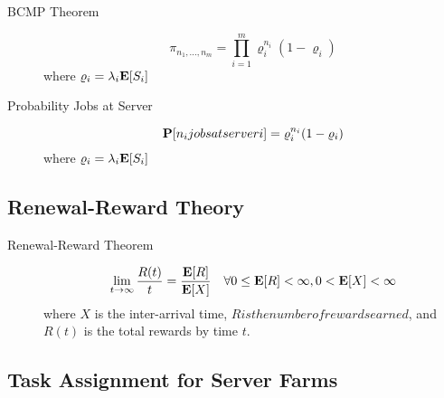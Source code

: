 \begin{description}

	\item [BCMP Theorem]
		\begin{equation}
		\pi_{n_{1},...,n_{m}} = \prod_{i=1}^{m} \varrho_{i}^{n_{i}} (1-\varrho_{i})
		\end{equation}		
		where $\varrho_{i}=\lambda_{i}\mathbf{E}[S_{i}]$
		
	\item [Probability Jobs at Server]
		\begin{equation}
		\mathbf{P}[n_{i} jobs at server i] = \varrho_{i}^{n_{i}} (1-\varrho_{i})
		\end{equation}
		where $\varrho_{i}=\lambda_{i}\mathbf{E}[S_{i}]$
	
\end{description}




\subsection{Renewal-Reward Theory}

\begin{description}
	
	\item [Renewal-Reward Theorem]
		\begin{equation}
		\lim_{t \to \infty}\frac{R(t)}{t}=\frac{\mathbf{E}[R]}{\mathbf{E}[X]} \quad \forall 0\leq\mathbf{E}[R]<\infty,0<\mathbf{E}[X]<\infty
		\end{equation}
		where $X$ is the inter-arrival time, $R is the number of rewards earned$, and $R(t)$ is the total rewards by time $t$.
	
\end{description}




\subsection{Task Assignment for Server Farms}

